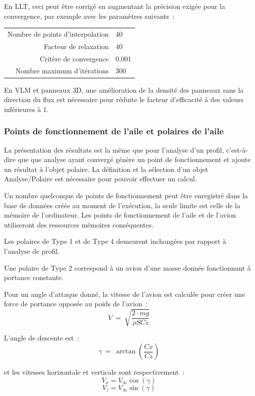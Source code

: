 \documentclass[a4paper,twoside,12pt,dvips]{article}
\begin{document}
En LLT, ceci peut être corrigé en augmentant la précision exigée pour la convergence, par exemple avec les paramètres suivants~:

\begin{tabular}{r@{\ =\ }l}
	Nombre de points d’interpolation & 40\\
	Facteur de relaxation & 40\\
	Critère de convergence & 0.001\\
	Nombre maximum d’itérations & 300
\end{tabular}

En VLM et panneaux 3D, une amélioration de la densité des panneaux sans la 
direction du flux est nécessaire pour réduite le facteur d’efficacité à des 
valeurs inférieures à 1. 

\subsubsection{Points de fonctionnement de l’aile et polaires de l’aile}
La présentation des résultats est la même que pour l’analyse d’un profil, c’est-à-dire que que analyse ayant convergé génère un point de fonctionnement et ajoute un résultat à l’objet polaire. La définition et la sélection d’un objet Analyse/Polaire est nécessaire pour pouvoir effectuer un calcul.

 
Un nombre quelconque de points de fonctionnement peut être enregistré dans 
la base de données créée au moment de l’exécution, la seule limite est celle de la mémoire de l’ordinateur. Les points de fonctionnement de l’aile et de l’avion utiliseront des ressources mémoires conséquentes.

Les polaires de Type 1 et de Type 4 demeurent inchangées par rapport à l’analyse de profil.

Une polaire de Type 2 correspond à un avion d’une masse donnée fonctionnant à portance constante.

Pour un angle d’attaque donné, la vitesse de l’avion est calculée pour créer une
force de portance opposée au poids de l’avion~: 
$$V~=~\sqrt{\frac{2\cdot mg}{\rho SCz}}$$

L’angle de descente est~:
$$\gamma~=~\arctan \left(\frac{Cx}{Cz}\right)$$

et les vitesses horizontale et verticale sont respectivement~:
$$ V_x = V_\infty \cos(\gamma) $$
$$ V_z = V_\infty \sin(\gamma) $$
\end{document}
